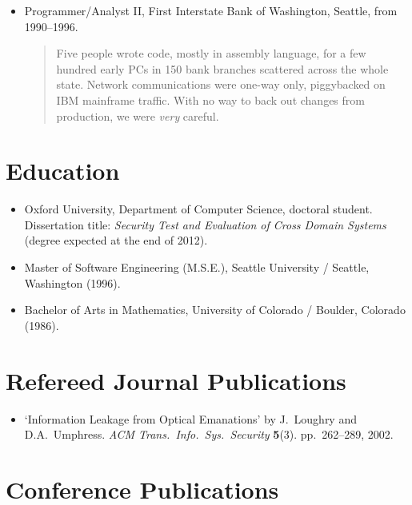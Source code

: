 \documentclass[letterpaper]{article}
\begin{document}
\begin{itemize}
	\item Programmer/Analyst II, First Interstate Bank of Washington, Seattle, from 1990--1996.

		\begin{quote}\vspace{-2mm}
			Five people wrote code, mostly in assembly language, for a few hundred early PCs in
			150 bank branches scattered across the whole state.  Network communications were
			one-way only, piggybacked on IBM mainframe traffic.  With no way to back out changes
			from production, we were \emph{very} careful.
		\end{quote}

\end{itemize}

\section*{Education} %

\begin{itemize}
    \item Oxford University, Department of Computer Science,
		doctoral student.  Dissertation title: \emph{Security Test and Evaluation
		of Cross Domain Systems} (degree expected at the end of 2012).

    \item Master of Software Engineering (M.S.E.), Seattle
		University / Seattle, Washington (1996).

    \item Bachelor of Arts in Mathematics, University of
		Colorado / Boulder, Colorado (1986).
\end{itemize}

\section*{Refereed Journal Publications} %

\begin{itemize}
    \item `Information Leakage from Optical Emanations' by J.\ Loughry
    and D.A.\ Umphress. \emph{ACM Trans.\ Info.\ Sys.\ Security} \textbf{5}(3).
    pp.\ 262--289, 2002.
\end{itemize}

\section*{Conference Publications} %
\end{document}

